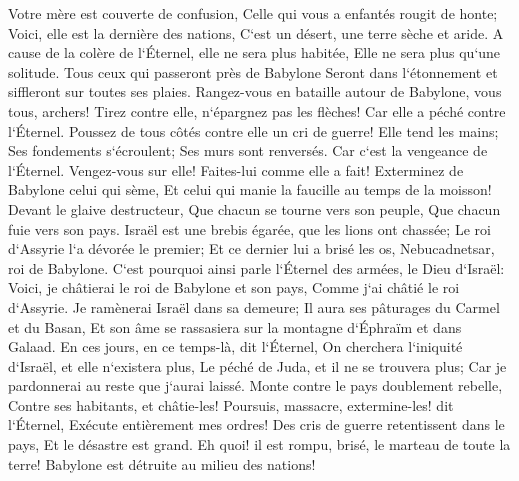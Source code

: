 \verse Votre mère est couverte de confusion, Celle qui vous a enfantés rougit de honte; Voici, elle est la dernière des nations, C`est un désert, une terre sèche et aride. 
\verse A cause de la colère de l`Éternel, elle ne sera plus habitée, Elle ne sera plus qu`une solitude. Tous ceux qui passeront près de Babylone Seront dans l`étonnement et siffleront sur toutes ses plaies. 
\verse Rangez-vous en bataille autour de Babylone, vous tous, archers! Tirez contre elle, n`épargnez pas les flèches! Car elle a péché contre l`Éternel. 
\verse Poussez de tous côtés contre elle un cri de guerre! Elle tend les mains; Ses fondements s`écroulent; Ses murs sont renversés. Car c`est la vengeance de l`Éternel. Vengez-vous sur elle! Faites-lui comme elle a fait! 
\verse Exterminez de Babylone celui qui sème, Et celui qui manie la faucille au temps de la moisson! Devant le glaive destructeur, Que chacun se tourne vers son peuple, Que chacun fuie vers son pays. 
\verse Israël est une brebis égarée, que les lions ont chassée; Le roi d`Assyrie l`a dévorée le premier; Et ce dernier lui a brisé les os, Nebucadnetsar, roi de Babylone. 
\verse C`est pourquoi ainsi parle l`Éternel des armées, le Dieu d`Israël: Voici, je châtierai le roi de Babylone et son pays, Comme j`ai châtié le roi d`Assyrie. 
\verse Je ramènerai Israël dans sa demeure; Il aura ses pâturages du Carmel et du Basan, Et son âme se rassasiera sur la montagne d`Éphraïm et dans Galaad. 
\verse En ces jours, en ce temps-là, dit l`Éternel, On cherchera l`iniquité d`Israël, et elle n`existera plus, Le péché de Juda, et il ne se trouvera plus; Car je pardonnerai au reste que j`aurai laissé. 
\verse Monte contre le pays doublement rebelle, Contre ses habitants, et châtie-les! Poursuis, massacre, extermine-les! dit l`Éternel, Exécute entièrement mes ordres! 
\verse Des cris de guerre retentissent dans le pays, Et le désastre est grand. 
\verse Eh quoi! il est rompu, brisé, le marteau de toute la terre! Babylone est détruite au milieu des nations! 
